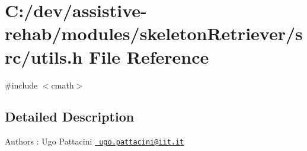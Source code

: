 \section{C\+:/dev/assistive-\/rehab/modules/skeleton\+Retriever/src/utils.h File Reference}
\label{utils_8h}
{\ttfamily \#include $<$cmath$>$}\newline


\subsection{Detailed Description}
\begin{DoxyAuthor}{Authors}
\+: Ugo Pattacini \href{mailto:ugo.pattacini@iit.it}{\texttt{ ugo.\+pattacini@iit.\+it}} 
\end{DoxyAuthor}
